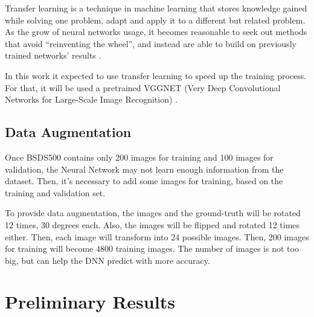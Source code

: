 \documentclass[10pt,twocolumn,letterpaper]{article}
\begin{document}
Transfer learning is a technique in machine learning that stores knowledge gained while solving one problem, adapt and apply it to a different but related problem. As the grow of neural networks usage, it becomes reasonable to seek out methods that avoid ``reinventing the wheel'', and
 instead are able to build on previously trained networks' results \cite{PRATT} \cite{WEISS2016}.

In this work it expected to use transfer learning to speed up the training process. For that, it will be used a pretrained VGGNET (Very Deep Convolutional Networks for Large-Scale Image Recognition) \cite{VGGNET}.


\subsection{Data Augmentation} \label{ssec:data_augmentation}


Once BSDS500 contains only 200 images for training and 100 images for validation, the Neural Network may not learn enough information from the dataset. Then, it's necessary to add some images for training, based on the training and validation set.

To provide data augmentation, the images and the ground-truth will be rotated 12 times, 30 degrees each. Also, the images will be flipped and rotated 12 times either. Then, each image will transform into 24 possible images. Then, 200 images for training will become 4800 training images. The number of images is not too big, but can help the DNN predict with more accuracy.

\section{Preliminary Results} \label{sec:results}



{\small


}
\end{document}
